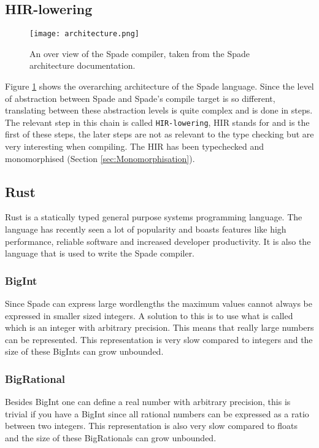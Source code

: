 \subsection{HIR-lowering}
\begin{figure}[h!]
  \texttt{[image: architecture.png]}
  \caption{An over view of the Spade compiler, taken from the Spade architecture documentation\cite{src:Architecture}.}
  \label{figArch}
\end{figure}

Figure \ref{figArch} shows the overarching architecture of the Spade language. Since the level of abstraction between Spade and Spade's compile target is so different, translating between these abstraction levels is quite complex and is done in steps. The relevant step in this chain is called \verb+HIR-lowering+, HIR stands for  and is the first of these steps, the later steps are not as relevant to the type checking but are very interesting when compiling. The HIR has been typechecked and monomorphised (Section \ref{sec:Monomorphisation})\cite{src:Architecture}.

\subsection{Rust}
Rust is a statically typed general purpose systems programming language. The language has recently seen a lot of popularity and boasts features like high performance, reliable software and increased developer productivity. It is also the language that is used to write the Spade compiler. \cite{src:Rust}

\subsubsection{BigInt}
Since Spade can express large wordlengths the maximum values cannot always be expressed in smaller sized integers. A solution to this is to use what is called  which is an integer with arbitrary precision. This means that really large numbers can be represented. This representation is very slow compared to  integers and the size of these BigInts can grow unbounded.

\subsubsection{BigRational}
Besides BigInt one can define a real number with arbitrary precision, this is trivial if you have a BigInt since all rational numbers can be expressed as a ratio between two integers. This representation is also very slow compared to  floats and the size of these BigRationals can grow unbounded. 


